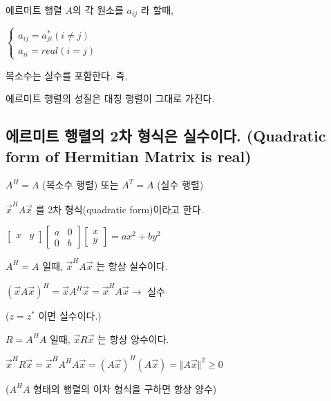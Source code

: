 \begin{theorem}
에르미트 행렬 $A$의 각 원소를 $a_{ij}$ 라 할때,

$\begin{cases} a_{ij} = a_{ji}^{\ast} (i \ne j) \\ a_{ii} = real (i=j)  \end{cases}$
\end{theorem}



\begin{theorem}
복소수는 실수를 포함한다. 즉,

에르미트 행렬의 성질은 대칭 행렬이 그대로 가진다.
\end{theorem}


\newpage
\subsection{에르미트 행렬의 2차 형식은 실수이다. (Quadratic form of Hermitian Matrix is real)}

\begin{definition} 
$A^H=A$ (복소수 행렬) 또는 $A^T=A$ (실수 행렬)

$\vec{x}^HA\vec{x}$ 를 2차 형식(quadratic form)이라고 한다. 

$\begin{bmatrix}x & y \end{bmatrix}\begin{bmatrix}a & 0 \\ 0 & b \end{bmatrix}\begin{bmatrix}x \\ y \end{bmatrix} = ax^2 + by^2$

\end{definition}


\begin{theorem}
$A^H=A$  일때,  $\vec{x}^HA\vec{x}$ 는 항상 실수이다.

$(\vec{x}A\vec{x})^H=\vec{x}A^H\vec{x}=\vec{x}^HA\vec{x} \rightarrow$ 실수

($z=z^{\ast}$ 이면 실수이다.)
\end{theorem}



\begin{theorem}
$R=A^HA$ 일때, $\vec{x}R\vec{x}$ 는 항상 양수이다.

$\vec{x}^HR\vec{x} = \vec{x}^HA^HA\vec{x} = (A\vec{x})^H(A\vec{x}) = \Vert A\vec{x} \Vert^2 \ge 0$

($A^HA$ 형태의 행렬의 이차 형식을 구하면 항상 양수)
\end{theorem}



